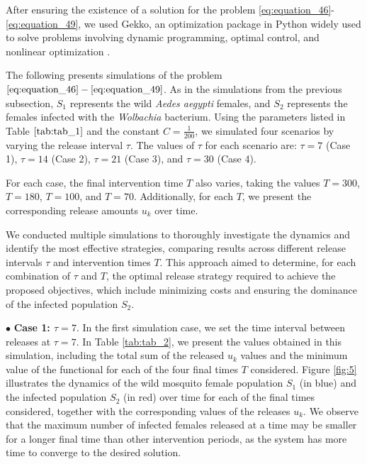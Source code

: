 \documentclass[10pt,letterpaper]{article}
\begin{document}
 After ensuring the existence of a solution for the problem \eqref{eq:equation_46}-\eqref{eq:equation_49}, we used Gekko, an optimization package in Python widely used to solve problems involving dynamic programming, optimal control, and nonlinear optimization \cite{gekko}. 

The following presents simulations of the problem $\eqref{eq:equation_46}-\eqref{eq:equation_49}$. As in the simulations from the previous subsection, $S_1$ represents the wild \textit{Aedes aegypti} females, and $S_2$ represents the females infected with the \textit{Wolbachia} bacterium. Using the parameters listed in Table $\eqref{tab:tab_1}$ and the constant $C = \frac{1}{200}$, we simulated four scenarios by varying the release interval $\tau$. The values of $\tau$ for each scenario are: $\tau = 7$ (Case 1), $\tau = 14$ (Case 2), $\tau = 21$ (Case 3), and $\tau = 30$ (Case 4).  

For each case, the final intervention time $T$ also varies, taking the values $T = 300$, $T = 180$, $T = 100$, and $T = 70$. Additionally, for each $T$, we present the corresponding release amounts $u_k$ over time.  

We conducted multiple simulations to thoroughly investigate the dynamics and identify the most effective strategies, comparing results across different release intervals $\tau$ and intervention times $T$. This approach aimed to determine, for each combination of $\tau$ and $T$, the optimal release strategy required to achieve the proposed objectives, which include minimizing costs and ensuring the dominance of the infected population $S_2$. 

$\bullet$ \textbf{Case 1: $\tau = 7$}. In the first simulation case, we set the time interval between releases at $\tau = 7$. In Table \eqref{tab:tab_2}, we present the values obtained in this simulation, including the total sum of the released $u_k$ values and the minimum value of the functional for each of the four final times $T$ considered. Figure \eqref{fig:5} illustrates the dynamics of the wild mosquito female population $S_1$ (in blue) and the infected population $S_2$ (in red) over time for each of the final times considered, together with the corresponding values of the releases $u_k$. We observe that the maximum number of infected females released at a time may be smaller for a longer final time than other intervention periods, as the system has more time to converge to the desired solution.
\end{document}
